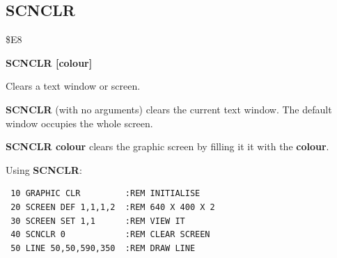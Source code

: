 \subsection{SCNCLR}
\begin{description}[leftmargin=2cm,style=nextline]
\item [Token:] \$E8
\item [Format:] {\bf SCNCLR [colour]}
\item [Usage:] Clears a text window or screen.

               {\bf SCNCLR} (with no arguments) clears the
               current text window. The default window
               occupies the whole screen.

               {\bf SCNCLR colour} clears the graphic screen by
               filling it it with the {\bf colour}.

\item [Example:] Using {\bf SCNCLR}:
\begin{tcolorbox}[colback=black,coltext=white]
\verbatimfont{\codefont}
\begin{verbatim}
 10 GRAPHIC CLR         :REM INITIALISE
 20 SCREEN DEF 1,1,1,2  :REM 640 X 400 X 2
 30 SCREEN SET 1,1      :REM VIEW IT
 40 SCNCLR 0            :REM CLEAR SCREEN
 50 LINE 50,50,590,350  :REM DRAW LINE
\end{verbatim}
\end{tcolorbox}
\end{description}


\newpage
